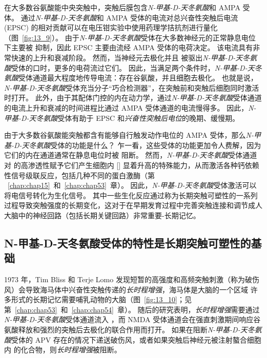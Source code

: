 在大多数谷氨酸能中央突触中，突触后膜包含\textit{N-甲基-D-天冬氨酸}和 AMPA 受体。
通过\textit{N-甲基-D-天冬氨酸}和 AMPA 受体的电流对总兴奋性突触后电流 (EPSC) 的相对贡献可以在电压钳实验中使用药理学拮抗剂进行量化（图~\ref{fig:13_9}）。
由于\textit{N-甲基-D-天冬氨酸}受体在大多数神经元的正常静息电位下主要被  抑制，因此 EPSC 主要由流经 AMPA 受体的电荷决定。
该电流具有非常快速的上升和衰减阶段。
然而，当神经元去极化并且  被驱出\textit{N-甲基-D-天冬氨酸}受体的口时，更多的电荷流过它们。
因此，当满足两个条件时，\textit{N-甲基-D-天冬氨酸}受体通道最大程度地传导电流：存在谷氨酸，并且细胞去极化。
也就是说，\textit{N-甲基-D-天冬氨酸}受体充当分子“巧合检测器”，在突触前和突触后细胞同时激活时打开。
此外，由于其配体门控的内在动力学，通过\textit{N-甲基-D-天冬氨酸}受体通道的电流上升和衰减的时间进程比通过 AMPA 受体通道的电流慢得多。
因此，\textit{N-甲基-D-天冬氨酸}受体有助于 EPSC 和\textit{兴奋性突触后电位}的晚期、缓慢期。


由于大多数谷氨酸能突触都含有能够自行触发动作电位的 AMPA 受体，那么\textit{N-甲基-D-天冬氨酸}受体的功能是什么？
乍一看，这些受体的功能更加令人费解，因为它们的内在通道通常在静息电位时被  阻断。
然而，\textit{N-甲基-D-天冬氨酸}受体通道对  的高渗透性赋予它们产生细胞内 [] 显着升高的特殊能力，从而激活各种钙依赖性信号级联反应，包括几种不同的蛋白激酶（第 ~\ref{chap:chap15}~和~\ref{chap:chap53}~章）。
因此，\textit{N-甲基-D-天冬氨酸}受体激活可以将电信号转化为生化信号。
其中一些生化反应通过称为长期突触可塑性的一系列过程导致突触强度的长期变化，这对于在早期发育过程中完善突触连接和调节成人大脑中的神经回路（包括长期关键回路）非常重要-长期记忆。



\subsection{N-甲基-D-天冬氨酸受体的特性是长期突触可塑性的基础}

1973 年，Tim Bliss 和 Terje Lomo 发现短暂的高强度和高频突触刺激（称为破伤风）会导致海马体中兴奋性突触传递的\textit{长时程增强}，海马体是大脑的一个区域 许多形式的长期记忆需要哺乳动物的大脑（图~\ref{fig:13_10}；见第~\ref{chap:chap53}~和~\ref{chap:chap54}~章）。
随后的研究表明，\textit{长时程增强}需要通过\textit{N-甲基-D-天冬氨酸}受体通道流入 ，而 NMDA 受体通道会在强直刺激期间响应谷氨酸释放和强烈的突触后去极化的联合作用而打开。
如果在阻断\textit{N-甲基-D-天冬氨酸}受体的 APV 存在的情况下递送破伤风，或者如果突触后神经元被注射螯合细胞内  的化合物，则\textit{长时程增强}被阻断。


